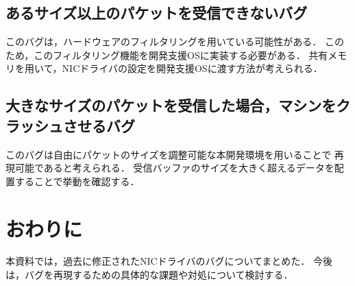 \documentclass[12pt]{jsarticle}
\begin{document}
\subsection{あるサイズ以上のパケットを受信できないバグ}
このバグは，ハードウェアのフィルタリングを用いている可能性がある．
このため，このフィルタリング機能を開発支援OSに実装する必要がある．
共有メモリを用いて，NICドライバの設定を開発支援OSに渡す方法が考えられる．

\subsection{大きなサイズのパケットを受信した場合，マシンをクラッシュさせるバグ}
このバグは自由にパケットのサイズを調整可能な本開発環境を用いることで
再現可能であると考えられる．
受信バッファのサイズを大きく超えるデータを配置することで挙動を確認する．

\section{おわりに}
本資料では，過去に修正されたNICドライバのバグについてまとめた．
今後は，バグを再現するための具体的な課題や対処について検討する．
\end{document}
